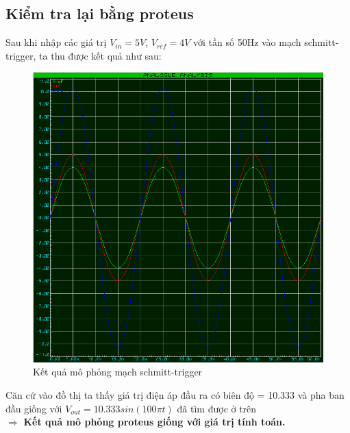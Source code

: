 \subsection{Kiểm tra lại bằng proteus}
\hspace*{0.6cm}Sau khi nhập các giá trị $V_{in} = 5V$, $V_{ref} = 4V$ với tần số 50Hz vào mạch schmitt-trigger, ta thu được kết quả như sau:
\begin{figure}[H]
    \centering
    \includegraphics[width=1\textwidth]{pictures/smithplot}
    \caption{Kết quả mô phỏng mạch schmitt-trigger}
\end{figure}
Căn cứ vào đồ thị ta thấy giá trị điện áp đầu ra có biên độ = 10.333 và pha ban đầu giống với $V_{out} = 10.333sin(100\pi  t)$ đã tìm được ở trên\\
\hspace*{0.6cm}$\Rightarrow$ \textbf{Kết quả mô phỏng proteus giống với giá trị tính toán.}